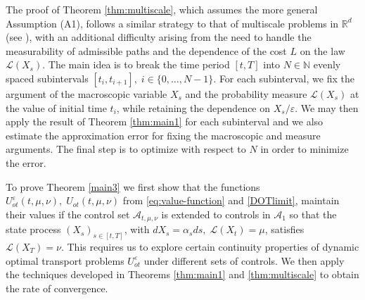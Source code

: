 \documentclass[reqno,11pt]{amsart}
\numberwithin{equation}{section}
\newcommand{\R}{\mathbb{R}} %
\newcommand{\e}{\varepsilon}
\newcommand{\nd}{\noindent}
\begin{document}

\nd
The proof of Theorem \ref{thm:multiscale}, which assumes the more general Assumption (A1), follows a similar strategy to that of multiscale problems in $\R^d$ (see \cite{HanJang2023}), with an additional difficulty arising from the need to handle the measurability of admissible paths and the dependence of the cost $L$ on the law $\mathcal{L}(X_s)$. The main idea is to break the time period $[t,T]$ into $N\in \mathbb{N}$ evenly spaced subintervals $[t_i,t_{i+1}],\;i\in \{0,\ldots,N-1\}$. For each subinterval, we fix the argument of the macroscopic variable $X_s$ and the probability measure $\mathcal{L}(X_s)$ at the value of initial time $t_i$, while retaining the dependence on $X_s/\e$. We may then apply the result of Theorem \ref{thm:main1} for each subinterval and we also estimate the approximation error for fixing the macroscopic and measure arguments. The final step is to optimize with respect to $N$ in order to minimize the error.
\vspace{2mm}

\nd
To prove Theorem \ref{main3} we first show that the functions $U^\e_{ot}(t,\mu,\nu),\; U_{ot}(t,\mu,\nu)$ from \eqref{eq:value-function} and \eqref{DOTlimit}, maintain their values if the control set $\mathcal{A}_{t,\mu,\nu}$ is extended to controls in $\mathcal{A}_1$ so that the state process $(X_s)_{s\in [t,T]}$, with $dX_s=\alpha_sds,\;\mathcal{L}(X_t)=\mu$, satisfies $\mathcal{L}(X_T)=\nu$. This requires us to explore certain continuity properties of dynamic optimal transport problems $U^\e_{ot}$ under different sets of controls. We then apply the techniques developed in Theorems \ref{thm:main1} and \ref{thm:multiscale} to obtain the rate of convergence.



\end{document}
